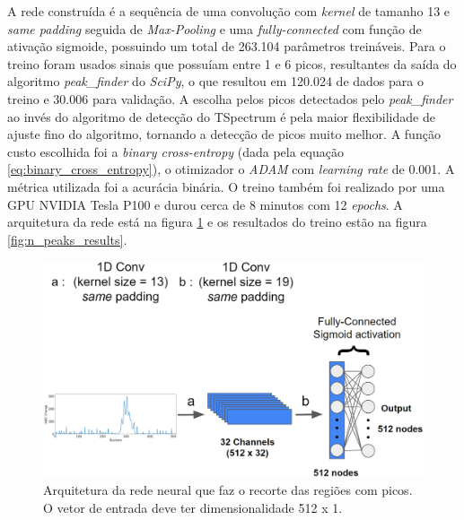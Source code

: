 \documentclass[a4paper,12pt,oneside]{book}
\begin{document}
\par A rede construída é a sequência de uma convolução com \textit{kernel} de tamanho 13 e \textit{same padding} seguida de \textit{Max-Pooling} e uma \textit{fully-connected} com função de ativação sigmoide, possuindo um total de 263.104 parâmetros treináveis. Para o treino foram usados sinais que possuíam entre 1 e 6 picos, resultantes da saída do algoritmo \textit{peak\_finder} do \textit{SciPy}, o que resultou em 120.024 de dados para o treino e 30.006 para validação. A escolha pelos picos detectados pelo \textit{peak\_finder} ao invés do algoritmo de detecção do TSpectrum é pela maior flexibilidade de ajuste fino do algoritmo, tornando a detecção de picos muito melhor. A função custo escolhida foi a \textit{binary cross-entropy} (dada pela equação \ref{eq:binary_cross_entropy}), o otimizador o \textit{ADAM} com \textit{learning rate} de 0.001. A métrica utilizada foi a acurácia binária. O treino também foi realizado por uma GPU NVIDIA Tesla P100 e durou cerca de 8 minutos com 12 \textit{epochs}. A arquitetura da rede está na figura \ref{fig:arq:n_peaks} e os resultados do treino estão na figura \ref{fig:n_peaks_results}.

\begin{figure}[H]
    \centering
    \includegraphics[scale = 0.35]{figs/n_peaks.png}
    \caption{Arquitetura da rede neural que faz o recorte das regiões com picos. O vetor de entrada deve ter dimensionalidade 512 x 1.}
    \label{fig:arq:n_peaks}
\end{figure}
\end{document}
